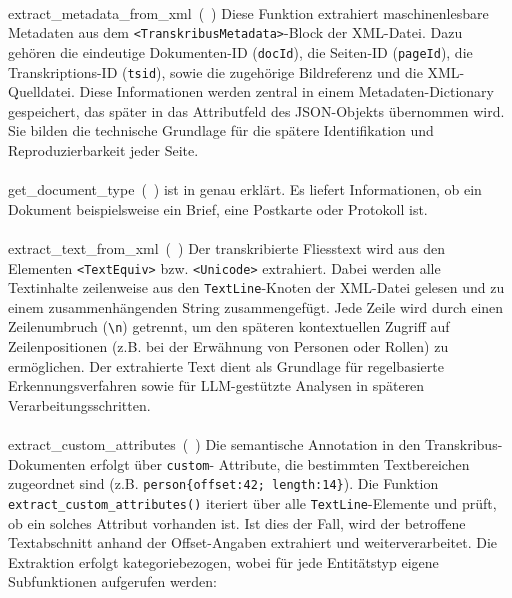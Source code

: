 \documentclass[12pt, a4paper, ngerman, bidi=default]{article}
\makeatletter
\newcommand{\code}[1]{\colorbox{VeryLightGray}{\texttt{#1}}} %
\let\oldparagraph\paragraph%
\renewcommand{\paragraph}{
    \@ifstar%
      \xxxParagraphStar%
      \xxxParagraphNoStar%
 }
\newcommand{\xxxParagraphStar}[1]{\oldparagraph*{#1}\mbox{}}
\newcommand{\xxxParagraphNoStar}[1]{\oldparagraph{#1}\mbox{}}
\makeatother
\begin{document}
\paragraph{extract\_metadata\_from\_xml~(~)} Diese Funktion extrahiert maschinenlesbare Metadaten aus dem 
\code{<TranskribusMetadata>}-Block der XML-Datei. Dazu gehören die eindeutige Dokumenten-ID (\code{docId}), die Seiten-ID 
(\code{pageId}), die Transkriptions-ID (\code{tsid}), sowie die zugehörige Bildreferenz und die XML-Quelldatei. Diese Informationen 
werden zentral in einem Metadaten-Dictionary gespeichert, das später in das Attributfeld des JSON-Objekts übernommen wird. 
Sie bilden die technische Grundlage für die spätere Identifikation und Reproduzierbarkeit jeder Seite.

\paragraph{get\_document\_type~(~)} ist in  genau erklärt. Es liefert Informationen, ob ein Dokument beispielsweise ein Brief, eine Postkarte oder Protokoll ist.

\paragraph{extract\_text\_from\_xml~(~)} Der transkribierte Fliesstext wird aus den Elementen \code{<TextEquiv>} bzw. 
\code{<Unicode>} extrahiert. Dabei werden alle Textinhalte zeilenweise aus den \code{TextLine}-Knoten der XML-Datei gelesen und zu 
einem zusammenhängenden String zusammengefügt. Jede Zeile wird durch einen Zeilenumbruch (\code{\textbackslash n}) getrennt, um den 
späteren kontextuellen Zugriff auf Zeilenpositionen (z.B. bei der Erwähnung von Personen oder Rollen) zu ermöglichen. Der extrahierte 
Text dient als Grundlage für regelbasierte Erkennungsverfahren sowie für LLM-gestützte Analysen in späteren Verarbeitungsschritten.

\paragraph{extract\_custom\_attributes~(~)} Die semantische Annotation in den Transkribus-Dokumenten erfolgt über \code{custom}-
Attribute, die bestimmten Textbereichen zugeordnet sind (z.B. \code{person\{offset:42; length:14\}}). Die Funktion 
\code{extract\_custom\_attributes()} iteriert über alle \code{TextLine}-Elemente und prüft, ob ein solches Attribut vorhanden ist. 
Ist dies der Fall, wird der betroffene Textabschnitt anhand der Offset-Angaben extrahiert und weiterverarbeitet. Die Extraktion 
erfolgt kategoriebezogen, wobei für jede Entitätstyp eigene Subfunktionen aufgerufen werden:
\end{document}
